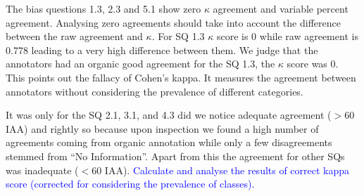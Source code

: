 \documentclass[sn-mathphys,Numbered]{sn-jnl}%
\theoremstyle{thmstyleone}%
\theoremstyle{thmstyletwo}%
\theoremstyle{thmstylethree}%
\begin{document}
The bias questions 1.3, 2.3 and 5.1 show zero $\kappa$ agreement and variable percent agreement.
Analysing zero agreements should take into account the difference between the raw agreement and $\kappa$.
For SQ 1.3 $\kappa$ score is 0 while raw agreement is 0.778 leading to a very high difference between them.
We judge that the annotators had an organic good agreement for the SQ 1.3, the $\kappa$ score was 0.
This points out the fallacy of Cohen's kappa.
It measures the agreement between annotators without considering the prevalence of different categories.


It was only for the SQ 2.1, 3.1, and 4.3 did we notice adequate agreement ($>$60 IAA) and rightly so because upon inspection we found a high number of agreements coming from organic annotation while only a few disagreements stemmed from ``No Information''.
Apart from this the agreement for other SQs was inadequate ($<$60 IAA).
\textcolor{blue}{Calculate and analyse the results of correct kappa score (corrected for considering the prevalence of classes).}
\end{document}
